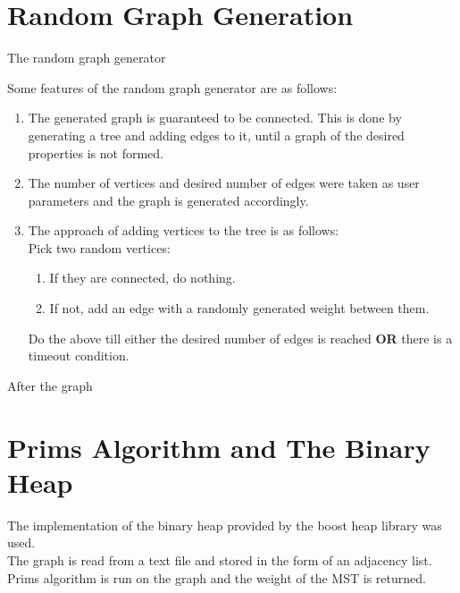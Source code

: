 \documentclass[]{article}
\begin{document}
\section{Random Graph Generation}
\begin{flushleft}
	The random graph generator 
	
	Some features of the random graph generator are as follows:
	
\begin{enumerate}
	\item The generated graph is guaranteed to be connected. This is done by generating a tree and adding edges to it, until a graph of the desired properties is not formed.

	\item The number of vertices and desired number of edges were taken as user parameters and the graph is generated accordingly.
	
	\item The approach of adding vertices to the tree is as follows:\\
	\vspace{10px}
Pick two random vertices:	
	\begin{enumerate}
	\item If they are connected, do nothing.
	\item If not, add an edge with a randomly generated weight between them.
	\end{enumerate}
Do the above till either the desired number of edges is reached \textbf{OR} there is a timeout condition.	
\end{enumerate}
	After the graph 
\end{flushleft}

\section{Prims Algorithm and The Binary Heap}
\begin{flushleft}
	The implementation of the binary heap provided by the boost heap library was used.\\
	The graph is read from a text file and stored in the form of an adjacency list. Prims algorithm is run on the graph and the weight of the MST is returned.
	
	  
\end{flushleft} 
\end{document}
